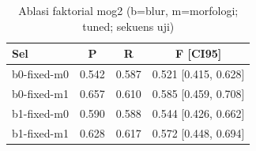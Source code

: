 \begin{table}[t]
\centering
\caption{Ablasi faktorial mog2 (b=blur, m=morfologi; tuned; sekuens uji)}
\label{tab:table_ablation_cells_mog2}
\begin{tabular}{lccc}
\toprule
Sel & P & R & F [CI95] \\
\midrule
b0-fixed-m0 & 0.542 & 0.587 & 0.521 [0.415, 0.628] \\
b0-fixed-m1 & 0.657 & 0.610 & 0.585 [0.459, 0.708] \\
b1-fixed-m0 & 0.590 & 0.588 & 0.544 [0.426, 0.662] \\
b1-fixed-m1 & 0.628 & 0.617 & 0.572 [0.448, 0.694] \\
\bottomrule
\end{tabular}
\end{table}
